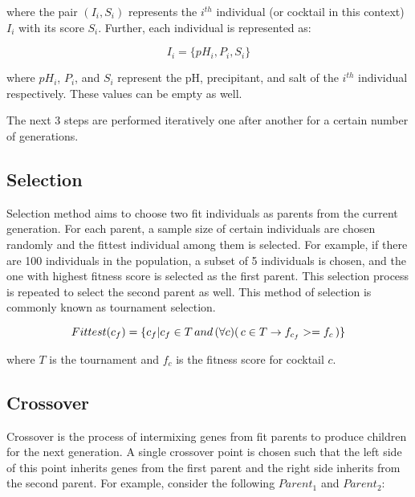 \noindent
where the pair $(I_{i}, S_{i})$ represents the $i^{th}$ individual (or cocktail in this context) $I_{i}$ with its score $S_{i}$. Further, each individual is represented as:

\begin{equation}
I_{i} = \{ pH_{i}, P_{i}, S_{i} \} \label{eq}
\end{equation}

\noindent
where $pH_{i}$, $P_{i}$, and $S_{i}$ represent the pH, precipitant, and salt of the $i^{th}$ individual respectively. These values can be empty as well.

The next 3 steps are performed iteratively one after another  for a certain number of generations.

\subsection{Selection} \label{sec:GA-selection}
Selection method aims to choose two fit individuals as parents from the current generation. For each parent, a sample size of certain individuals are chosen randomly and the fittest individual among them is selected. For example, if there are 100 individuals in the population, a subset of 5 individuals is chosen, and the one with highest fitness score is selected as the first parent. This selection process is repeated to select the second parent as well. This method of selection is commonly known as tournament selection. 



\begin{equation}
Fittest(c_{f}) = \{ c_{f}| c_{f} \in T \thinspace and \thinspace (\forall c) (\thinspace c \in T \rightarrow f_{c_{f}} >= f_{c} \thinspace  ) \} \label{eq}
\end{equation}

\noindent
where $T$ is the tournament and $f_{c}$ is the fitness score for cocktail $c$.


\subsection{Crossover} \label{sec:GA-crossover}
Crossover is the process of intermixing genes from fit parents to produce children for the next generation. A single crossover point is chosen such that the left side of this point inherits genes from the first parent and the right side inherits from the second parent. For example, consider the following $Parent_{1}$ and $Parent_{2}$: 

